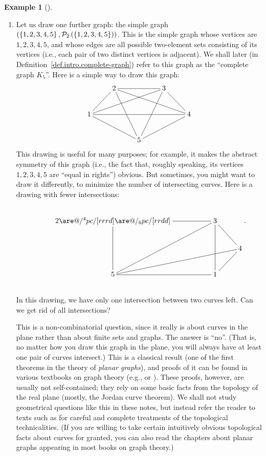 \documentclass[numbers=enddot,12pt,final,onecolumn,notitlepage]{scrartcl}%
\makeatletter
\theoremstyle{definition}
\newtheorem{exam}[theo]{Example}
\newenvironment{example}[1][]
{\begin{exam}[#1]\begin{leftbar}}
{\end{leftbar}\end{exam}}
\newcommand{\powset}[2][]{\ifthenelse{\equal{#2}{}}{\mathcal{P}\left(#1\right)}{\mathcal{P}_{#1}\left(#2\right)}}
\newcommand{\set}[1]{\left\{ #1 \right\}}
\newcommand{\tup}[1]{\left( #1 \right)}
\newcommand{\are}{\ar@{-}}
\makeatother
\begin{document}
\begin{example}
\begin{enumerate}
\item[\textbf{(c)}] Let us draw one further graph: the simple graph
$\tup{\set{1, 2, 3, 4, 5}, \powset[2]{\set{1, 2, 3, 4, 5}}}$. This is
the simple graph whose vertices are $1, 2, 3, 4, 5$, and whose edges
are all possible two-element sets consisting of its vertices (i.e.,
each pair of two distinct vertices is adjacent). We shall later (in
Definition~\ref{def.intro.complete-graph}) refer to this graph as
the ``complete graph $K_5$''. Here is a simple way to draw this graph:
\begin{align*}
\xymatrix{
& 2 \are[ld] \are[rr] \are[rrrd] \are[rdd] & & 3 \are[rd] \are[ldd] \are[llld] \\
1 \are[rrrr] \are[rrd] & & & & 4 \are[lld] \\
& & 5
}
\end{align*}
This drawing is useful for many purposes; for example, it makes the
abstract symmetry of this graph (i.e., the fact that, roughly
speaking, its vertices $1,2,3,4,5$ are ``equal in rights'') obvious.
But sometimes, you might want to draw it differently, to minimize the
number of intersecting curves. Here is a drawing with fewer
intersections:
\begin{align*}
\phantom{a} \\ %
\xymatrix{
& 2 \are[rr] \are@/^4pc/[rrrd] \are@/_6pc/[rrdd] \are[dd] & & 3 \are[rd] \are[lldd] \are[dd] \\
& & & & 4 \are[llld] \\
& 5 \are[rr] & & 1 \are[ru]
} . \\
\phantom{a} %
\end{align*}
In this drawing, we have only one intersection between two curves
left. Can we get rid of all intersections?

This is a non-combinatorial question, since it really is about curves
in the plane rather than about finite sets and graphs. The answer is
``no''. (That is, no matter how you draw this graph in the plane, you
will always have at least one pair of curves intersect.) This is a
classical result (one of the first theorems in the theory of
\textit{planar graphs}), and proofs of it can be found in various
textbooks on graph theory (e.g., \cite[Corollary 11.1(d)]{Harary69} or
\cite[Theorem 10.2]{BonMur08}). These proofs, however, are usually not
self-contained; they rely on some basic facts from the topology of the
real plane (mostly, the Jordan curve theorem). We shall not study
geometrical questions like this in these notes, but instead refer the
reader to texts such as \cite{FriFri98} for careful and complete
treatments of the topological technicalities.
(If you are willing to take certain intuitively obvious
topological facts about curves for granted, you can also read the
chapters about planar graphs appearing in most books on graph theory.)

\end{enumerate}

\end{example}
\end{document}
